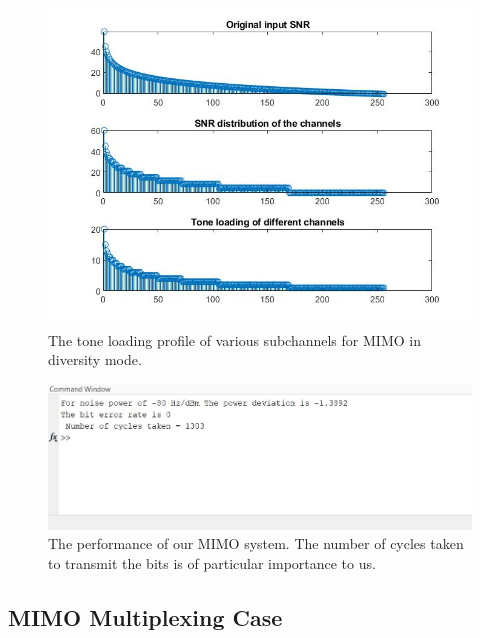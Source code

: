 \begin{figure}[!htbp]
\centering
\includegraphics[scale=0.7]{Chapter 4/Figures/MIMO Tone Loading Diversity}
\caption[MIMO Tone Loading in Diversity Case]{The tone loading profile of various subchannels for MIMO in diversity mode.}
\label{fig:mimo tone loading diversity}
\end{figure}

\begin{figure}[!htbp]
\centering
\includegraphics[scale=1]{Chapter 4/Figures/MIMO System Performance Diversity}
\caption[MIMO System Performance in Diversity Case]{The performance of our MIMO system. The number of cycles taken to transmit the bits is of particular importance to us.}
\label{fig:mimo system performance diversity}
\end{figure}

\subsection{MIMO Multiplexing Case}

